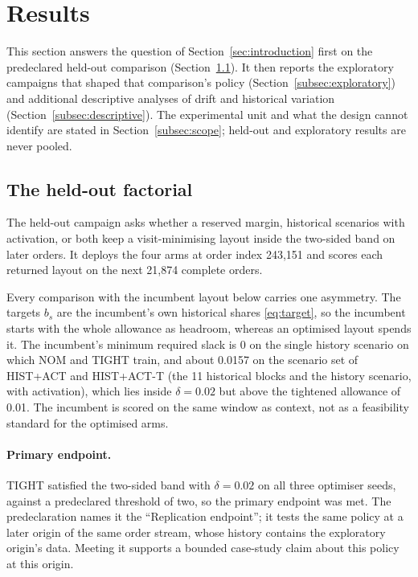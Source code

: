 \section{Results}\label{sec:results}
This section answers the question of Section~\ref{sec:introduction} first on the predeclared held-out comparison (Section~\ref{subsec:heldout}). It then reports the exploratory campaigns that shaped that comparison's policy (Section~\ref{subsec:exploratory}) and additional descriptive analyses of drift and historical variation (Section~\ref{subsec:descriptive}). The experimental unit and what the design cannot identify are stated in Section~\ref{subsec:scope}; held-out and exploratory results are never pooled.

\subsection{The held-out factorial}\label{subsec:heldout}
The held-out campaign asks whether a reserved margin, historical scenarios with activation, or both keep a visit-minimising layout inside the two-sided band on later orders. It deploys the four arms at order index 243,151 and scores each returned layout on the next 21,874 complete orders.

Every comparison with the incumbent layout below carries one asymmetry. The targets $b_s$ are the incumbent's own historical shares \eqref{eq:target}, so the incumbent starts with the whole allowance as headroom, whereas an optimised layout spends it. The incumbent's minimum required slack is 0 on the single history scenario on which NOM and TIGHT train, and about 0.0157 on the scenario set of HIST+ACT and HIST+ACT-T (the 11 historical blocks and the history scenario, with activation), which lies inside $\delta=0.02$ but above the tightened allowance of 0.01. The incumbent is scored on the same window as context, not as a feasibility standard for the optimised arms.

\paragraph{Primary endpoint.} TIGHT satisfied the two-sided band with $\delta=0.02$ on all three optimiser seeds, against a predeclared threshold of two, so the primary endpoint was met. The predeclaration names it the ``Replication endpoint''; it tests the same policy at a later origin of the same order stream, whose history contains the exploratory origin's data. Meeting it supports a bounded case-study claim about this policy at this origin.


